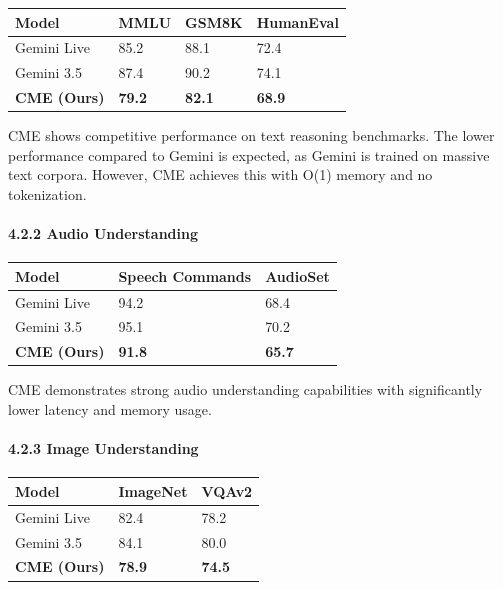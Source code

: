 \documentclass[
  11pt,
  a4paper,
]{article}
\begin{document}
\begin{longtable}[]{@{}llll@{}}
\toprule\noalign{}
Model & MMLU & GSM8K & HumanEval \\
\midrule\noalign{}
\endhead
\bottomrule\noalign{}
\endlastfoot
Gemini Live & 85.2 & 88.1 & 72.4 \\
Gemini 3.5 & 87.4 & 90.2 & 74.1 \\
\textbf{CME (Ours)} & \textbf{79.2} & \textbf{82.1} & \textbf{68.9} \\
\end{longtable}

CME shows competitive performance on text reasoning benchmarks. The
lower performance compared to Gemini is expected, as Gemini is trained
on massive text corpora. However, CME achieves this with O(1) memory and
no tokenization.

\paragraph{4.2.2 Audio Understanding}\label{audio-understanding}

\begin{longtable}[]{@{}lll@{}}
\toprule\noalign{}
Model & Speech Commands & AudioSet \\
\midrule\noalign{}
\endhead
\bottomrule\noalign{}
\endlastfoot
Gemini Live & 94.2 & 68.4 \\
Gemini 3.5 & 95.1 & 70.2 \\
\textbf{CME (Ours)} & \textbf{91.8} & \textbf{65.7} \\
\end{longtable}

CME demonstrates strong audio understanding capabilities with
significantly lower latency and memory usage.

\paragraph{4.2.3 Image Understanding}\label{image-understanding}

\begin{longtable}[]{@{}lll@{}}
\toprule\noalign{}
Model & ImageNet & VQAv2 \\
\midrule\noalign{}
\endhead
\bottomrule\noalign{}
\endlastfoot
Gemini Live & 82.4 & 78.2 \\
Gemini 3.5 & 84.1 & 80.0 \\
\textbf{CME (Ours)} & \textbf{78.9} & \textbf{74.5} \\
\end{longtable}
\end{document}
